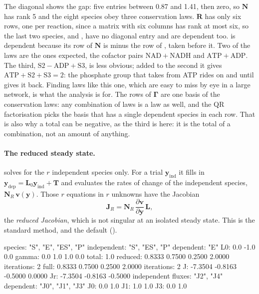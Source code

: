 \documentclass[11pt,a4paper,openany]{report}
\begin{document}
{{The diagonal shows the gap: five entries between 0.87 and 1.41, then zero,
so $\mathbf{N}$ has rank 5 and the eight species obey three conservation
laws. $\mathbf{R}$ has only six rows, one per reaction, since a matrix with
six columns has rank at most six, so the last two species,  and
, have no diagonal entry and are dependent too.  is
dependent because its row of $\mathbf{N}$ is minus the row of ,
taken before it. Two of the laws are the ones expected, the cofactor pairs
$\mathrm{NAD} + \mathrm{NADH}$ and $\mathrm{ATP} + \mathrm{ADP}$. The third,
$\mathrm{S2} - \mathrm{ADP} + \mathrm{S3}$, is less obvious; added to the
second it gives $\mathrm{ATP} + \mathrm{S2} + \mathrm{S3} = 2$: the
phosphate group that  takes from ATP rides on  and
 until  gives it back. Finding laws like this one, which
are easy to miss by eye in a large network, is what the analysis is for.
The rows of $\mathbf{\Gamma}$ are one basis of the conservation laws: any
combination of laws is a law as well, and the QR factorisation picks the
basis that has a single dependent species in each row. That is also why a
total can be negative, as the third is here: it is the total of a
combination, not an amount of anything.

\paragraph{The reduced steady state.}  solves for the
$r$ independent species only. For a trial $\mathbf{y}_{\mathrm{ind}}$ it fills in
$\mathbf{y}_{\mathrm{dep}} = \mathbf{L}_0 \mathbf{y}_{\mathrm{ind}} + \mathbf{T}$ and evaluates the rates of
change of the independent species, $\mathbf{N}_R\, \mathbf{v}(\mathbf{y})$. Those $r$ equations in $r$
unknowns have the Jacobian
\[
  \mathbf{J}_R = \mathbf{N}_R \, \frac{\partial \mathbf{v}}{\partial \mathbf{y}}\, \mathbf{L} ,
\]
the \emph{reduced Jacobian}, which is not singular at an isolated steady
state. This is the standard method, and the default
().

\begin{axonout}
species: {"S", "E", "ES", "P"}
independent: {"S", "ES", "P"}  dependent: {"E"}
L0: 0.0  -1.0  0.0    gamma: 0.0  1.0  1.0  0.0
total: 1.0
reduced: 0.8333  0.7500  0.2500  2.0000   iterations: 2
full: 0.8333  0.7500  0.2500  2.0000   iterations: 2
J:  -7.3504  -0.8163  -0.5000  0.0000
Jr: -7.3504  -0.8163  -0.5000
independent fluxes: {"J2", "J4"}  dependent: {"J0", "J1", "J3"}
J0: 0.0  1.0
J1: 1.0  1.0
J3: 0.0  1.0
\end{axonout}

}}
\end{document}
